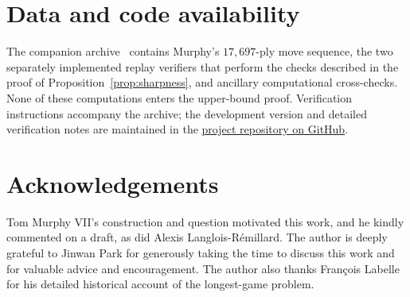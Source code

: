 \documentclass[11pt]{article}
\theoremstyle{definition}
\begin{document}
\section*{Data and code availability}

The companion archive~\cite{repo} contains Murphy's $17{,}697$-ply move
sequence, the two separately implemented replay verifiers that perform the
checks described in the proof of Proposition~\ref{prop:sharpness}, and
ancillary computational cross-checks. None of these computations enters the
upper-bound proof. Verification instructions accompany the archive; the
development version and detailed verification notes are maintained in the
\href{https://github.com/junyeobe0315/longest-chess-game}{project repository on
GitHub}.

\section*{Acknowledgements}

Tom Murphy VII's construction and question motivated this work, and he
kindly commented on a draft, as did Alexis Langlois-R\'emillard. The author is
deeply grateful to Jinwan Park for generously taking the time to discuss this
work and for valuable advice and encouragement. The author also thanks
Fran\c{c}ois Labelle for his detailed historical account of the
longest-game problem.
\end{document}
